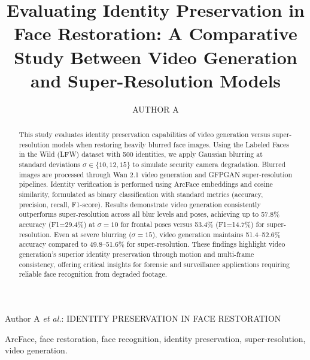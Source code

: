 \documentclass{ieeeaccess}
\begin{document}

\title{Evaluating Identity Preservation in Face Restoration: A Comparative Study Between Video Generation and Super-Resolution Models}

\author{\uppercase{author A}}
\address[1]{Post ....  (e-mail: yen.nguyenthi@hust.edu.vn).}

{Author A \MakeLowercase{\textit{et al.}}: IDENTITY PRESERVATION IN FACE RESTORATION}


\begin{abstract}
This study evaluates identity preservation capabilities of video generation versus super-resolution models when restoring heavily blurred face images. Using the Labeled Faces in the Wild (LFW) dataset with 500 identities, we apply Gaussian blurring at standard deviations $\sigma \in \{10, 12, 15\}$ to simulate security camera degradation. Blurred images are processed through Wan 2.1 video generation and GFPGAN super-resolution pipelines. Identity verification is performed using ArcFace embeddings and cosine similarity, formulated as binary classification with standard metrics (accuracy, precision, recall, F1-score). Results demonstrate video generation consistently outperforms super-resolution across all blur levels and poses, achieving up to 57.8\% accuracy (F1=29.4\%) at $\sigma=10$ for frontal poses versus 53.4\% (F1=14.7\%) for super-resolution. Even at severe blurring ($\sigma=15$), video generation maintains 51.4–52.6\% accuracy compared to 49.8–51.6\% for super-resolution. These findings highlight video generation’s superior identity preservation through motion and multi-frame consistency, offering critical insights for forensic and surveillance applications requiring reliable face recognition from degraded footage.
\end{abstract}

\begin{IEEEkeywords}
ArcFace, face restoration, face recognition, identity preservation, super-resolution, video generation.
\end{IEEEkeywords}

\titlepgskip=-15pt

\maketitle
\end{document}
